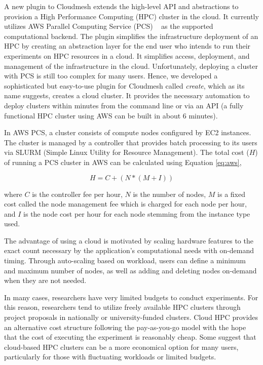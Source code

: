 \documentclass[sigconf]{acmart}
\begin{document}
A new plugin to Cloudmesh extends the high-level API and abstractions to provision a High Performance Computing  (HPC) cluster in the cloud. It currently utilizes AWS Parallel Computing Service (PCS) ~\citep{awspcs:online} as the supported computational backend. The plugin simplifies the infrastructure deployment of an HPC by creating an abstraction layer for the end user who intends to run their experiments on HPC resources in a cloud. It simplifies access, deployment, and management of the infrastructure in the cloud. Unfortunately, deploying a cluster with PCS is still too complex for many users. Hence, we developed a sophisticated but easy-to-use plugin for Cloudmesh called {\em create}, which as its name suggests, creates a cloud cluster. It provides the necessary automation to deploy clusters within minutes from the command line or via an API (a fully functional HPC cluster using AWS can be built in about 6 minutes).  

In AWS PCS, a cluster consists of compute nodes configured by EC2 instances. The cluster is managed by a controller that provides batch processing to its users via SLURM (Simple Linux Utility for Resource Management).  The total cost ($H$) of running a PCS cluster in AWS can be calculated using Equation \ref{eq:aws},

\begin{equation}
 H = C + (N * (M + I)) \label{eq:aws}
\end{equation}

where 
$C$ is the controller fee per hour, 
$N$ is the number of nodes, 
$M$ is a fixed cost called the node management fee which is charged for each node per hour, and
$I$ is the node cost per hour for each node stemming from the instance type used.

The advantage of using a cloud is motivated by scaling hardware features to the exact count necessary by the application's computational needs with on-demand timing. Through auto-scaling based on workload, users can define a minimum and maximum number of nodes, as well as adding and deleting nodes on-demand when they are not needed.

In many cases, researchers have very limited budgets to conduct experiments. For this reason, researchers tend to utilize freely available HPC clusters through project proposals in nationally or university-funded clusters. Cloud HPC provides an alternative cost structure following the pay-as-you-go model with the hope that the cost of executing the experiment is reasonably cheap.  Some suggest  \citep{munhoz_performance_2023} that cloud-based HPC clusters can be a more economical option for many users, particularly for those with fluctuating workloads or limited budgets. 
\end{document}
